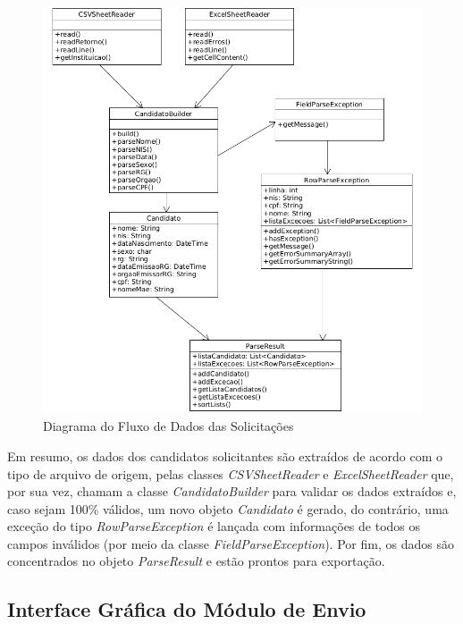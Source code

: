 \documentclass[
	12pt,			%
	openright,		%
	oneside,	
	a4paper,		%
	english,		%
	brazil			%
]{abntex2/abntex2}  %
\begin{document}
				\begin{figure}[H]
					\begin{center}
						
						\caption{Diagrama do Fluxo de Dados das Solicitações}
						\label{envio-uml}
						
						\includegraphics[scale=0.6]{img/envio-uml}
						
					\end{center}
				\end{figure}
	
				Em resumo, os dados dos candidatos solicitantes são extraídos de acordo com o tipo de arquivo de origem, pelas classes \textit{CSVSheetReader} e \textit{ExcelSheetReader} que, por sua vez, chamam a classe \textit{CandidatoBuilder} para validar os dados extraídos e, caso sejam 100\% válidos, um novo objeto \textit{Candidato} é gerado, do contrário, uma exceção do tipo \textit{RowParseException} é lançada com informações de todos os campos inválidos (por meio da classe \textit{FieldParseException}). Por fim, os dados são concentrados no objeto \textit{ParseResult} e estão prontos para exportação.
	
			\subsection{Interface Gráfica do Módulo de Envio}
	
\end{document}

